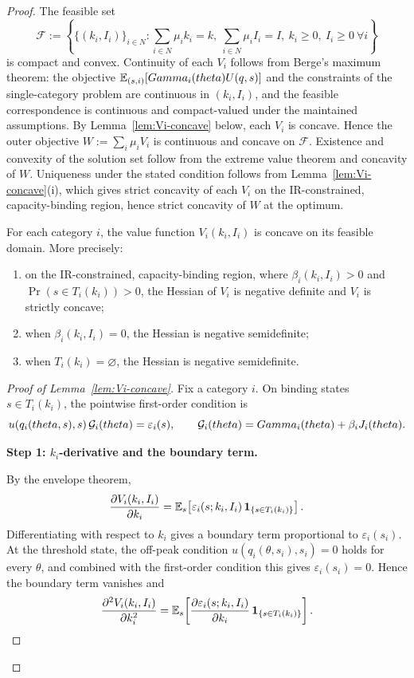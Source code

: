 \documentclass{class}
\begin{document}
\begin{proof}
The feasible set
\[
\mathcal F := \left\{ \{(k_i,I_i)\}_{i\in N} : \sum_{i\in N} \mu_i k_i = k,\ \sum_{i\in N}  \mu_iI_i = I,\ k_i\ge 0,\ I_i\ge 0\ \forall i \right\}
\]
is compact and convex. Continuity of each $V_i$ follows from Berge's maximum theorem: the objective $\mathbb{E}_{(s,i)}[Gamma_i(theta)U(q,s)]$ and the constraints of the single-category problem are continuous in $(k_i,I_i)$, and the feasible correspondence is continuous and compact-valued under the maintained assumptions. By Lemma~\ref{lem:Vi-concave} below, each $V_i$ is concave. Hence the outer objective $W:=\sum_i \mu_i V_i$ is continuous and concave on $\mathcal F$. Existence and convexity of the solution set follow from the extreme value theorem and concavity of $W$. Uniqueness under the stated condition follows from Lemma~\ref{lem:Vi-concave}(i), which gives strict concavity of each $V_i$ on the IR-constrained, capacity-binding region, hence strict concavity of $W$ at the optimum.

\begin{lemma}\label{lem:Vi-concave}
For each category $i$, the value function $V_i(k_i,I_i)$ is concave on its feasible domain. More precisely:

\begin{enumerate}[label=(\roman*), leftmargin=1cm]
    \item on the IR-constrained, capacity-binding region, where $\beta_i(k_i,I_i)>0$ and $\Pr(s\in T_i(k_i))>0$, the Hessian of $V_i$ is negative definite and $V_i$ is strictly concave;
    \item when $\beta_i(k_i,I_i)=0$, the Hessian is negative semidefinite;
    \item when $T_i(k_i)=\varnothing$, the Hessian is negative semidefinite.
\end{enumerate}
\end{lemma}

\begin{proof}[Proof of Lemma~\ref{lem:Vi-concave}]
Fix a category $i$. On binding states $s\in T_i(k_i)$, the pointwise first-order condition is
\[
u\!\left(q_i(theta,s),s\right)\mathcal{G}_i(theta)=\varepsilon_i(s), \qquad \mathcal{G}_i(theta)=Gamma_i(theta)+\beta_i J_i(theta).
\]


\noindent\textbf{Step 1: \(k_i\)-derivative and the boundary term.}

By the envelope theorem,
\[
\frac{\partial V_i(k_i,I_i)}{\partial k_i} = \mathbb{E}_s\!\left[\varepsilon_i(s;k_i,I_i)\,\mathbf{1}_{\{s\in T_i(k_i)\}}\right].
\]
Differentiating with respect to $k_i$ gives a boundary term proportional to $\varepsilon_i(s_i)$. At the threshold state, the off-peak condition $u(q_i(\theta,s_i),s_i)=0$ holds for every $\theta$, and combined with the first-order condition this gives $\varepsilon_i(s_i)=0$. Hence the boundary term vanishes and
\[
\frac{\partial^2 V_i(k_i,I_i)}{\partial  k_i^2} = \mathbb{E}_s\!\left[\frac{\partial \varepsilon_i(s;k_i,I_i)}{\partial  k_i}\,\mathbf{1}_{\{s\in T_i(k_i)\}}\right].
\]




\end{proof}
\end{proof}
\end{document}
